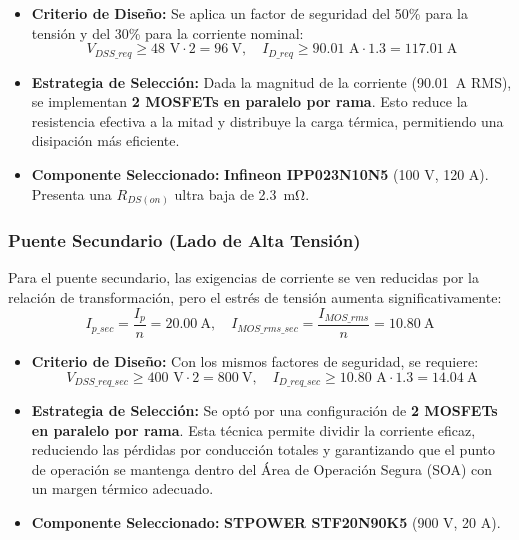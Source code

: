 \documentclass[11pt, a4paper]{article}
\begin{document}
\begin{itemize}
    \item \textbf{Criterio de Diseño:} Se aplica un factor de seguridad del 50\% para la tensión y del 30\% para la corriente nominal:
    \begin{equation}
        V_{DSS\_req} \ge 48\text{ V} \cdot 2 = \SI{96}{\volt}, \quad I_{D\_req} \ge 90.01\text{ A} \cdot 1.3 = \SI{117.01}{\ampere}
    \end{equation}
    \item \textbf{Estrategia de Selección:} Dada la magnitud de la corriente (\SI{90.01}{\ampere} RMS), se implementan \textbf{2 MOSFETs en paralelo por rama}. Esto reduce la resistencia efectiva a la mitad y distribuye la carga térmica, permitiendo una disipación más eficiente.
    \item \textbf{Componente Seleccionado:} \textbf{Infineon IPP023N10N5} (100 V, 120 A). Presenta una $R_{DS(on)}$ ultra baja de \SI{2.3}{\milli\ohm}.
\end{itemize}

\subsubsection{Puente Secundario (Lado de Alta Tensión)}

Para el puente secundario, las exigencias de corriente se ven reducidas por la relación de transformación, pero el estrés de tensión aumenta significativamente:
\begin{equation}
    I_{p\_sec} = \frac{I_p}{n} = \SI{20.00}{\ampere}, \quad I_{MOS\_rms\_sec} = \frac{I_{MOS\_rms}}{n} = \SI{10.80}{\ampere}
\end{equation}

\begin{itemize}
    \item \textbf{Criterio de Diseño:} Con los mismos factores de seguridad, se requiere:
    \begin{equation}
        V_{DSS\_req\_sec} \ge 400\text{ V} \cdot 2 = \SI{800}{\volt}, \quad I_{D\_req\_sec} \ge 10.80\text{ A} \cdot 1.3 = \SI{14.04}{\ampere}
    \end{equation}
    \item \textbf{Estrategia de Selección:} Se optó por una configuración de \textbf{2 MOSFETs en paralelo por rama}. Esta técnica permite dividir la corriente eficaz, reduciendo las pérdidas por conducción totales y garantizando que el punto de operación se mantenga dentro del Área de Operación Segura (SOA) con un margen térmico adecuado.
    \item \textbf{Componente Seleccionado:} \textbf{STPOWER STF20N90K5} (900 V, 20 A).
\end{itemize}
\end{document}

